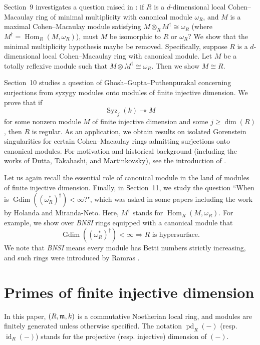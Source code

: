 \documentclass[10. pt,a4paper]{amsart}
\theoremstyle{definition}
\theoremstyle{remark}
\newcommand{\id}{\operatorname{id}}
\newcommand{\pd}{\operatorname{pd}}
\newcommand{\Gdim}{\operatorname{Gdim}}
\newcommand{\Hom}{\operatorname{Hom}}
\newcommand{\fm}{\frak{m}}
\begin{document}
Section~9 investigates a question raised in \cite[Question 4.2]{celgo}: if $R$ is a $d$-dimensional local Cohen--Macaulay ring of minimal multiplicity with canonical module $\omega_R$, and $M$ is a maximal Cohen--Macaulay module satisfying $M\otimes_R M^\dagger\cong\omega_R$ (where $M^\dagger=\Hom_R(M,\omega_R)$), must $M$ be isomorphic to $R$ or $\omega_R$? We show that the minimal multiplicity hypothesis maybe be removed. Specifically, 	suppose $R$ is a $d$-dimensional local Cohen--Macaulay ring with canonical module. Let $M$ be a totally reflexive module such that $M \otimes M^\dagger \cong \omega_R$. Then  we show $M \cong R$.



\medskip

Section~10 studies a question of Ghosh--Gupta--Puthenpurakal \cite[Question 1.7]{q3} concerning surjections from syzygy modules onto modules of finite injective dimension. We prove that if
\[
\operatorname{Syz}_j(k)\twoheadrightarrow M
\]
for some nonzero module $M$ of finite injective dimension and some $j\geq \dim(R)$, then $R$ is regular. As an application, we obtain results on isolated Gorenstein singularities for certain Cohen--Macaulay rings admitting surjections onto canonical modules. For motivation and historical background (including the works of Dutta, Takahashi, and Martinkovsky), see the introduction of \cite{q3}.

\medskip
Let us again recall the essential role of canonical module in the land of modules of finite injective dimension.
Finally, in Section~11, we study the question ``When is $\Gdim((\omega_R^\ast)^\dagger)<\infty$?", which was asked in some papers including the work by Holanda and Miranda-Neto.  Here, $M^\dagger$ stands for $\Hom_R(M, \omega_R)$. For example, we show over  \textit{BNSI} rings equipped with a canonical module that
\[
\Gdim((\omega_R^\ast)^\dagger)<\infty \Longrightarrow R \text{ is hypersurface}.
\]
We note that  \textit{BNSI} means every module has Betti numbers strictly increasing, and such rings were introduced by Ramras \cite{ram}.



\medskip
\section{Primes   of finite injective dimension}
  

In this paper, \((R,\fm,k)\) is a commutative Noetherian local ring, and modules are finitely generated unless otherwise specified.  
The notation \(\pd_R(-)\) (resp. \(\id_R(-)\)) stands for the projective (resp. injective) dimension of \((-)\).
\end{document}
